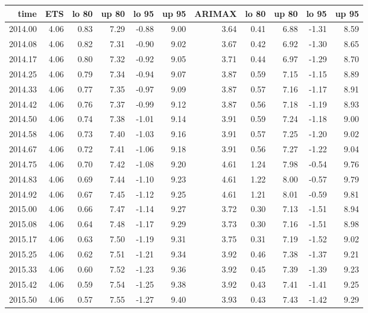 \documentclass[10pt,a4paper]{article}\usepackage[]{graphicx}\usepackage[]{color}
\begin{document}
\begin{table}[ht]
\centering
\begin{tabular}{rrrrrrrrrrr}
  \hline
time & ETS  & lo 80 & up 80 & lo 95 & up 95 & ARIMAX  & lo 80 & up 80 & lo 95 & up 95 \\ 
  \hline
2014.00 & 4.06 & 0.83 & 7.29 & -0.88 & 9.00 & 3.64 & 0.41 & 6.88 & -1.31 & 8.59 \\ 
  2014.08 & 4.06 & 0.82 & 7.31 & -0.90 & 9.02 & 3.67 & 0.42 & 6.92 & -1.30 & 8.65 \\ 
  2014.17 & 4.06 & 0.80 & 7.32 & -0.92 & 9.05 & 3.71 & 0.44 & 6.97 & -1.29 & 8.70 \\ 
  2014.25 & 4.06 & 0.79 & 7.34 & -0.94 & 9.07 & 3.87 & 0.59 & 7.15 & -1.15 & 8.89 \\ 
  2014.33 & 4.06 & 0.77 & 7.35 & -0.97 & 9.09 & 3.87 & 0.57 & 7.16 & -1.17 & 8.91 \\ 
  2014.42 & 4.06 & 0.76 & 7.37 & -0.99 & 9.12 & 3.87 & 0.56 & 7.18 & -1.19 & 8.93 \\ 
  2014.50 & 4.06 & 0.74 & 7.38 & -1.01 & 9.14 & 3.91 & 0.59 & 7.24 & -1.18 & 9.00 \\ 
  2014.58 & 4.06 & 0.73 & 7.40 & -1.03 & 9.16 & 3.91 & 0.57 & 7.25 & -1.20 & 9.02 \\ 
  2014.67 & 4.06 & 0.72 & 7.41 & -1.06 & 9.18 & 3.91 & 0.56 & 7.27 & -1.22 & 9.04 \\ 
  2014.75 & 4.06 & 0.70 & 7.42 & -1.08 & 9.20 & 4.61 & 1.24 & 7.98 & -0.54 & 9.76 \\ 
  2014.83 & 4.06 & 0.69 & 7.44 & -1.10 & 9.23 & 4.61 & 1.22 & 8.00 & -0.57 & 9.79 \\ 
  2014.92 & 4.06 & 0.67 & 7.45 & -1.12 & 9.25 & 4.61 & 1.21 & 8.01 & -0.59 & 9.81 \\ 
  2015.00 & 4.06 & 0.66 & 7.47 & -1.14 & 9.27 & 3.72 & 0.30 & 7.13 & -1.51 & 8.94 \\ 
  2015.08 & 4.06 & 0.64 & 7.48 & -1.17 & 9.29 & 3.73 & 0.30 & 7.16 & -1.51 & 8.98 \\ 
  2015.17 & 4.06 & 0.63 & 7.50 & -1.19 & 9.31 & 3.75 & 0.31 & 7.19 & -1.52 & 9.02 \\ 
  2015.25 & 4.06 & 0.62 & 7.51 & -1.21 & 9.34 & 3.92 & 0.46 & 7.38 & -1.37 & 9.21 \\ 
  2015.33 & 4.06 & 0.60 & 7.52 & -1.23 & 9.36 & 3.92 & 0.45 & 7.39 & -1.39 & 9.23 \\ 
  2015.42 & 4.06 & 0.59 & 7.54 & -1.25 & 9.38 & 3.92 & 0.43 & 7.41 & -1.41 & 9.25 \\ 
  2015.50 & 4.06 & 0.57 & 7.55 & -1.27 & 9.40 & 3.93 & 0.43 & 7.43 & -1.42 & 9.29 \\ 

\end{tabular}
\end{table}
\end{document}
